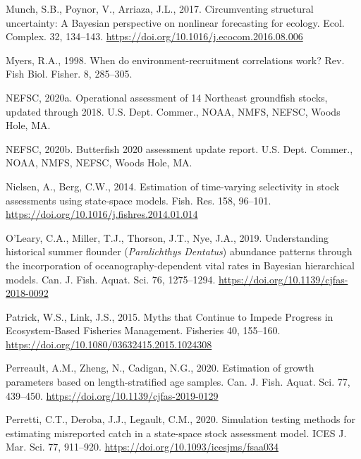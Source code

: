 \documentclass[]{article}
\begin{document}
\leavevmode\hypertarget{ref-munch2017Circumventing}{}%
Munch, S.B., Poynor, V., Arriaza, J.L., 2017. Circumventing structural
uncertainty: A Bayesian perspective on nonlinear forecasting for
ecology. Ecol. Complex. 32, 134--143.
\url{https://doi.org/10.1016/j.ecocom.2016.08.006}

\leavevmode\hypertarget{ref-myers1998When}{}%
Myers, R.A., 1998. When do environment-recruitment correlations work?
Rev. Fish Biol. Fisher. 8, 285--305.

\leavevmode\hypertarget{ref-nefsc2020Operational}{}%
NEFSC, 2020a. Operational assessment of 14 Northeast groundfish stocks,
updated through 2018. U.S. Dept. Commer., NOAA, NMFS, NEFSC, Woods Hole,
MA.

\leavevmode\hypertarget{ref-nefsc2020Butterfish}{}%
NEFSC, 2020b. Butterfish 2020 assessment update report. U.S. Dept.
Commer., NOAA, NMFS, NEFSC, Woods Hole, MA.

\leavevmode\hypertarget{ref-nielsen2014Estimation}{}%
Nielsen, A., Berg, C.W., 2014. Estimation of time-varying selectivity in
stock assessments using state-space models. Fish. Res. 158, 96--101.
\url{https://doi.org/10.1016/j.fishres.2014.01.014}

\leavevmode\hypertarget{ref-oleary2019Understanding}{}%
O'Leary, C.A., Miller, T.J., Thorson, J.T., Nye, J.A., 2019.
Understanding historical summer flounder (\emph{Paralichthys}
\emph{Dentatus}) abundance patterns through the incorporation of
oceanography-dependent vital rates in Bayesian hierarchical models. Can.
J. Fish. Aquat. Sci. 76, 1275--1294.
\url{https://doi.org/10.1139/cjfas-2018-0092}

\leavevmode\hypertarget{ref-patrick2015Myths}{}%
Patrick, W.S., Link, J.S., 2015. Myths that Continue to Impede Progress
in Ecosystem-Based Fisheries Management. Fisheries 40, 155--160.
\url{https://doi.org/10.1080/03632415.2015.1024308}

\leavevmode\hypertarget{ref-perreault2020Estimation}{}%
Perreault, A.M., Zheng, N., Cadigan, N.G., 2020. Estimation of growth
parameters based on length-stratified age samples. Can. J. Fish. Aquat.
Sci. 77, 439--450. \url{https://doi.org/10.1139/cjfas-2019-0129}

\leavevmode\hypertarget{ref-perretti2020Simulation}{}%
Perretti, C.T., Deroba, J.J., Legault, C.M., 2020. Simulation testing
methods for estimating misreported catch in a state-space stock
assessment model. ICES J. Mar. Sci. 77, 911--920.
\url{https://doi.org/10.1093/icesjms/fsaa034}
\end{document}
